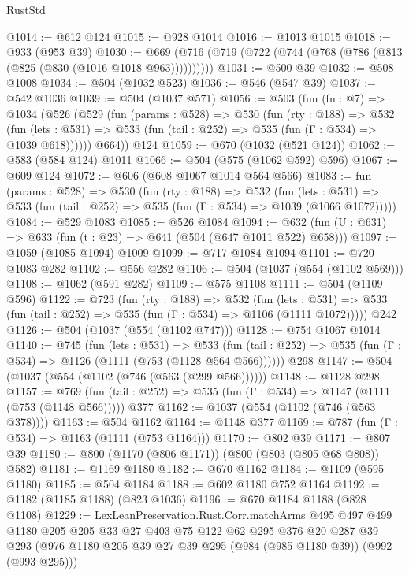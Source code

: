 \begin{lexlean}{RustStd}
\begin{coremodule}
@1014 := @612 @124
@1015 := @928 @1014
@1016 := @1013 @1015
@1018 := @933 (@953 @39)
@1030 := @669 (@716 (@719 (@722 (@744 (@768 (@786 (@813 (@825 (@830 (@1016 @1018 @963))))))))))
@1031 := @500 @39
@1032 := @508 @1008
@1034 := @504 (@1032 @523)
@1036 := @546 (@547 @39)
@1037 := @542 @1036
@1039 := @504 (@1037 @571)
@1056 := @503
    (fun (fn : @7) =>
    @1034
      (@526
        (@529
          (fun (params : @528) =>
          @530
            (fun (rty : @188) =>
            @532
              (fun (lets : @531) =>
              @533 (fun (tail : @252) => @535 (fun (Γ : @534) => @1039 @618))))))
        @664))
    @124
@1059 := @670 (@1032 (@521 @124))
@1062 := @583 (@584 @124) @1011
@1066 := @504 (@575 (@1062 @592) @596)
@1067 := @609 @124
@1072 := @606 (@608 @1067 @1014 @564 @566)
@1083 := fun (params : @528) =>
  @530
    (fun (rty : @188) =>
    @532
      (fun (lets : @531) =>
      @533 (fun (tail : @252) => @535 (fun (Γ : @534) => @1039 (@1066 @1072)))))
@1084 := @529 @1083
@1085 := @526 @1084
@1094 := @632 (fun (U : @631) => @633 (fun (t : @23) => @641 (@504 (@647 @1011 @522) @658)))
@1097 := @1059 (@1085 @1094) @1009
@1099 := @717 @1084 @1094
@1101 := @720 @1083 @282
@1102 := @556 @282
@1106 := @504 (@1037 (@554 (@1102 @569)))
@1108 := @1062 (@591 @282)
@1109 := @575 @1108
@1111 := @504 (@1109 @596)
@1122 := @723
    (fun (rty : @188) =>
    @532
      (fun (lets : @531) =>
      @533 (fun (tail : @252) => @535 (fun (Γ : @534) => @1106 (@1111 @1072)))))
    @242
@1126 := @504 (@1037 (@554 (@1102 @747)))
@1128 := @754 @1067 @1014
@1140 := @745
    (fun (lets : @531) =>
    @533 (fun (tail : @252) => @535 (fun (Γ : @534) => @1126 (@1111 (@753 (@1128 @564 @566))))))
    @298
@1147 := @504 (@1037 (@554 (@1102 (@746 (@563 (@299 @566))))))
@1148 := @1128 @298
@1157 := @769 (fun (tail : @252) => @535 (fun (Γ : @534) => @1147 (@1111 (@753 (@1148 @566))))) @377
@1162 := @1037 (@554 (@1102 (@746 (@563 @378))))
@1163 := @504 @1162
@1164 := @1148 @377
@1169 := @787 (fun (Γ : @534) => @1163 (@1111 (@753 @1164)))
@1170 := @802 @39
@1171 := @807 @39
@1180 := @800 (@1170 (@806 @1171)) (@800 (@803 (@805 @68 @808)) @582)
@1181 := @1169 @1180
@1182 := @670 @1162
@1184 := @1109 (@595 @1180)
@1185 := @504 @1184
@1188 := @602 @1180 @752 @1164
@1192 := @1182 (@1185 @1188) (@823 @1036)
@1196 := @670 @1184 @1188 (@828 @1108)
@1229 := LexLeanPreservation.Rust.Corr.matchArms
    @495
    @497
    @499
    @1180
    @205
    @205
    @33
    @27
    @403
    @75
    @122
    @62
    @295
    @376
    @20
    @287
    @39
    @293
    (@976 @1180 @205 @39 @27 @39 @295 (@984 (@985 @1180 @39)) (@992 (@993 @295)))

\end{coremodule}
\end{lexlean}
